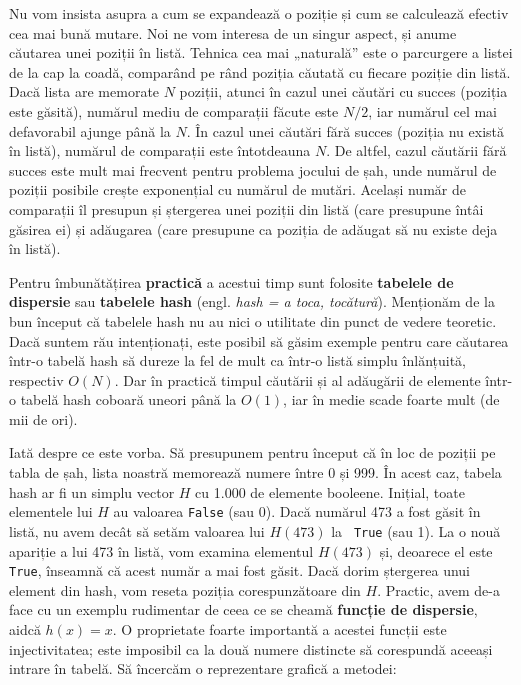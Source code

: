 Nu vom insista asupra a cum se expandează o poziție și cum se calculează
efectiv cea mai bună mutare. Noi ne vom interesa de un singur aspect, și anume
căutarea unei poziții în listă. Tehnica cea mai „naturală” este o parcurgere a
listei de la cap la coadă, comparând pe rând poziția căutată cu fiecare
poziție din listă. Dacă lista are memorate $N$ poziții, atunci în cazul unei
căutări cu succes (poziția este găsită), numărul mediu de comparații făcute
este $N/2$, iar numărul cel mai defavorabil ajunge până la $N$. În cazul unei
căutări fără succes (poziția nu există în listă), numărul de comparații este
întotdeauna $N$. De altfel, cazul căutării fără succes este mult mai frecvent
pentru problema jocului de șah, unde numărul de poziții posibile crește
exponențial cu numărul de mutări. Același număr de comparații îl presupun și
ștergerea unei poziții din listă (care presupune întâi găsirea ei) și
adăugarea (care presupune ca poziția de adăugat să nu existe deja în listă).

Pentru îmbunătățirea {\bf practică} a acestui timp sunt folosite {\bf tabelele
  de dispersie} sau {\bf tabelele hash} (engl. {\it hash = a toca,
  tocătură}). Menționăm de la bun început că tabelele hash nu au nici o
utilitate din punct de vedere teoretic. Dacă suntem rău intenționați, este
posibil să găsim exemple pentru care căutarea într-o tabelă hash să dureze la
fel de mult ca într-o listă simplu înlănțuită, respectiv $O(N)$. Dar în
practică timpul căutării și al adăugării de elemente într-o tabelă hash
coboară uneori până la $O(1)$, iar în medie scade foarte mult (de mii de ori).

Iată despre ce este vorba. Să presupunem pentru început că în loc de poziții
pe tabla de șah, lista noastră memorează numere între 0 și 999. În acest caz,
tabela hash ar fi un simplu vector $H$ cu 1.000 de elemente booleene. Inițial,
toate elementele lui $H$ au valoarea {\tt False} (sau 0). Dacă numărul 473 a
fost găsit în listă, nu avem decât să setăm valoarea lui $H(473)$ la {\tt
  True} (sau 1). La o nouă apariție a lui 473 în listă, vom examina elementul
$H(473)$ și, deoarece el este {\tt True}, înseamnă că acest număr a mai fost
găsit. Dacă dorim ștergerea unui element din hash, vom reseta poziția
corespunzătoare din $H$. Practic, avem de-a face cu un exemplu rudimentar de
ceea ce se cheamă {\bf funcție de dispersie}, aidcă $h(x) = x$. O proprietate
foarte importantă a acestei funcții este injectivitatea; este imposibil ca la
două numere distincte să corespundă aceeași intrare în tabelă. Să încercăm o
reprezentare grafică a metodei:

